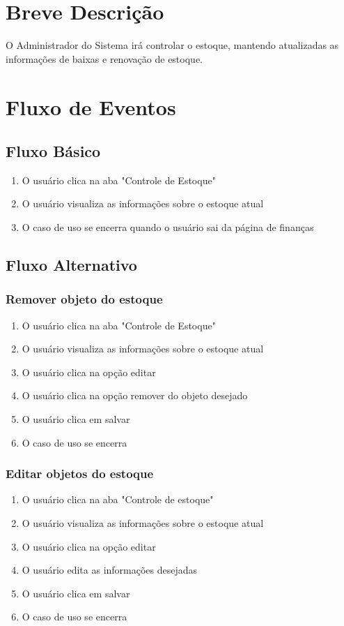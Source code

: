 \section{Breve Descrição}

O Administrador do Sistema irá controlar o estoque, mantendo atualizadas as informações de baixas e renovação de estoque.


\section{Fluxo de Eventos}
\subsection{Fluxo Básico}

\begin{enumerate}
	\item O usuário clica na aba "Controle de Estoque"
	\item O usuário visualiza as informações sobre o estoque atual
	\item O caso de uso se encerra quando o usuário sai da página de finanças
\end{enumerate}

\subsection{Fluxo Alternativo}
\subsubsection{Remover objeto do estoque}
\begin{enumerate}
	\item O usuário clica na aba "Controle de Estoque"
	\item O usuário visualiza as informações sobre o estoque atual
	\item O usuário clica na opção editar
	\item O usuário clica na opção remover do objeto desejado
	\item O usuário clica em salvar
	\item O caso de uso se encerra
\end{enumerate}

\subsubsection{Editar objetos do estoque}
\begin{enumerate}
	\item O usuário clica na aba "Controle de estoque"
	\item O usuário visualiza as informações sobre o estoque atual
	\item O usuário clica na opção editar
	\item O usuário edita as informações desejadas
	\item O usuário clica em salvar
	\item O caso de uso se encerra
\end{enumerate}

